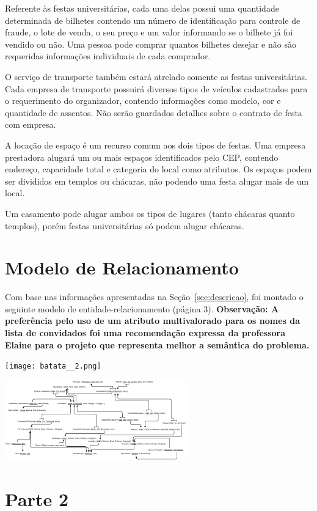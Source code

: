 \documentclass[12pt,a4paper]{article}
\begin{document}
	Referente às festas universitárias, cada uma delas possui uma quantidade determinada de bilhetes contendo um número de identificação para controle de fraude, o lote de venda, o seu preço e um valor informando se o bilhete já foi vendido ou não. Uma pessoa pode comprar quantos bilhetes desejar e não são requeridas informações individuais de cada comprador.

	O serviço de transporte também estará atrelado somente as festas universitárias. Cada empresa de transporte possuirá diversos tipos de veículos cadastrados para o requerimento do organizador, contendo informações como modelo, cor e quantidade de assentos. Não serão guardados detalhes sobre o contrato de festa com empresa.

	A locação de espaço é um recurso comum aos dois tipos de festas. Uma empresa prestadora alugará um ou mais espaços identificados pelo CEP, contendo endereço, capacidade total e categoria do local como atributos. Os espaços podem ser divididos em templos ou chácaras, não podendo uma festa alugar mais de um local.
    
    Um casamento pode alugar ambos os tipos de lugares (tanto chácaras quanto templos), porém festas universitárias só podem alugar chácaras.

\section{Modelo de Relacionamento}

Com base nas informações apresentadas na Seção~\ref{sec:descricao}, foi montado o seguinte modelo de entidade-relacionamento (página 3).
\textbf{Observação: A preferência pelo uso de um atributo multivalorado para os nomes da lista de convidados foi uma recomendação expressa da professora Elaine para o projeto que representa melhor a semântica do problema.}

\newpage
\texttt{[image: batata\_\_2.png]}


\includegraphics[width=300px]{T2.png}
\newpage

\section{Parte 2}
\end{document}
